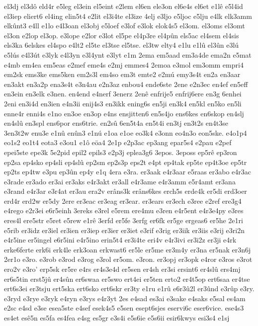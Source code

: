 {el3dj
el3dô
eld4r
e5leg
el3ein
el5eint
e2lem
el6en
ele3on
el6e4s
el6et
e1lê
e5l4id
el3iep
eliert6
el4ing
elin5t4
e2lit
el3i4te
el3ize
4elj
e3ljo
e5ljoc
e5lju
e4lk
elk3amm
elkûnt3
e4ll
e1lo
e4l3oan
el3obj
e5loef
e3lof
e3lok
elok4s5
el3om.
el3oms
el3omt
el3on
e2lop
el3op.
e3lope
e2lor
e3lot
el5pe
el4p3re
el4pûn
els5ac
el4sem
el4sis
els3ka
6elskes
el4spo
e4lt2
el5te
el3tse
el5tse.
el3tw
elty4
e1lu
e1lû
el3ûn
e3lú
e5lús
e4l3út
e3lyk
e4l3yn
e3l4ynt
e3lyt
e1m
2ema
em5aad
em3a4de
ema2n
e5mat
e4mb
em4ea
em5eas
e2mef
eme4s
e2mj
emmes4
2emoa
e3mol
em3omm
empri4
em2sk
ems3ke
ems5ken
em2s3l
em4so
em3t
emte2
e2mú
emy3s4t
en2a
en3aar
en3akt
en3a2p
ena3s4t
e3n4au
e2n3az
enbou4
ende6ste
2ene
e2n3ec
en4ef
en5eff
en3ein
en3elk
e3nen.
en4end
e4nerf
3enerz
2enê
enfrije5
enfrij6ere
en3g
6enhei
2eni
en3i4d
en3ien
e4n3ii
enij4s3
en3ikk
ening6s
en5ji
en3k4
en5kl
en5ko
en5li
enne4r
enni4s
e1no
en3oe
en3op
e4ns
ensjitten6
en5s4jo
ens6kes
en6skop
en4slj
en4slû
en3spl
ens6por
ens6trie.
en2sû
6en5t4a
en5t4i
en3tj
en3t2s
en4t3se
3en3t2w
enu3e
e1nû
enûn3
e1nú
e1oa
e1oe
eo3k4
e3onn
eo4n3o
eon5ske.
e4o1p4
eo1s2
eo1t4
eota3
e3ou1
e1ô
eöa4
2e1p
e2p3ac
ep3ang
epar5s4
e2pau
e2pef
epei5ste
epe3k
5e2pid
epil2
epils3
e2p3j
eplea3g6
3epos.
3eposs
ep5rê
ep3ron
ep2sa
ep4sko
ep4sli
ep4slû
ep2sm
ep2s3p
eps2t
e4pt
ep4tak
ep5te
ep4t3oe
ep5tr
ep2ts
ep4tw
e3pu
ep3ûn
ep4y
e1q
4era
e3ra.
er3aak
e4r3aar
e5raas
er3abo
e4r3ac
e3rade
er3ado
er3ai
er3aks
e4r3akt
er3all
e4r3ame
e4r3amm
e5r4amt
er3ana
e3rand
e4r3ar
e3r4at
er3au
era2v
erâns3k
erâns6kes
erch5s
erde4k
er5di
erd3oer
erd4r
erd2w
er5dy
2ere
er3eac
er3eag
er3ear.
er3ears
er3ech
e3ree
e2ref
ere3g4
e4rego
e2r3ei
e6r5einh
3ereks
e3rel
e5rem
ere4mu
e3ren
e4r5ent
e4r3e4py
e3res
eres4l
ere5str
e5ret
e5rew
e1rê
3erfd
er5fe
3erfg
er6fk
er5ge
ergeas6
er5he
2e1ri
e5rib
er3idz
er3iel
er3ien
er3iep
er3ier
er3iet
e3rif
e3rig
er3iik
er3iis
e3rij
e3ri2n
e4r5ine
er5ingel
e6r5ini
e4r5ino
erin5t4
er3i4te
eri4v
e4r3ivi
er3i2z
er3ji
e4rk
erke6ferte
erk6i
erk4le
erk3oan
erkwast6
er5le
er5me
er3m4y
er3na
er5nak
er3n6j
2er1o
e3ro.
e3rob
e3rod
e3rog
e3rol
er5om.
e3ron.
er3opj
er3opk
e4ror
e3ros
e3rot
ero2v
e3ro'
erp5sk
er5re
e4rs
er4s3e4d
er5sen
er4sh
er3si
ersint6
er4slû
ers4mj
er6s5tin
erst5jû
er4sûn
er6swaa
er5swo
ert4ei
er5ten
erto2
er4t5op
ert6saa
er4tse
ert6s3ei
er3tsju
ert5ska
ert6sko
ert6skr
er3ty
e1ru
e1rû
e6r3û2l
er3ûnd
e3rûp
e3ry.
e3ryd
e3rye
e3ryk
e4ryn
e3rys
e4r3yt
2es
e4sad
es3ai
e3sake
e4saks
e5sal
es4am
e2sc
e4sd
e3se
esea5ste
e4sef
esek4s5
e5sen
esept6sjes
eservi6c
eser6vice.
ese4s3
es4et
esê5n
es5fa
es4fea
e4sg
es5gr
e3s4i
e5s6ie
e5s6ii
esir6kwys
esi3s4
e1sj
}
